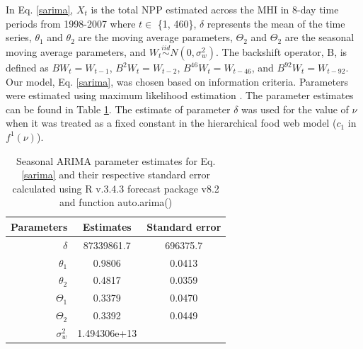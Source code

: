 \documentclass[oneside,12pt,final]{sty/ucthesis-CA2012}
\let\cite\citep                             %
\begin{document}
\begin{mainmatter}
In Eq. \ref{sarima}, $X_t$ is the total NPP estimated across the MHI in 8-day time periods from 1998-2007 where $t \in$ \{1, 460\}, $\delta$ represents the mean of the time series, $\theta_1$ and $\theta_2$ are the moving average parameters, $\Theta_2$ and $\Theta_2$ are the seasonal moving average parameters, and $W_t \stackrel{iid}{\sim} N(0,\sigma_w^2)$. The backshift operator, B, is defined as $ BW_t  = W_{t-1}$, $B^2W_t  = W_{t-2}$, $B^{46}W_t  = W_{t-46}$, and $B^{92}W_t  = W_{t-92}$.  Our model, Eq. \ref{sarima}, was chosen based on information criteria. Parameters were estimated using maximum likelihood estimation \cite{forecast1, forecast2}. The parameter estimates can be found in Table \ref{sarima_parameters}. The estimate of parameter $\delta$ was used for the value of $\nu$ when it was treated as a fixed constant in the hierarchical food web model ($c_1$ in $f^1(\nu)$).

\begin{table}[H]
\centering
\caption{Seasonal ARIMA parameter estimates for Eq. \ref{sarima} and their respective standard error calculated using R v.3.4.3 \cite{Rcite} forecast package v8.2 and function auto.arima() \cite{forecast1, forecast2} }
\begin{tabular}{r|c|c}
  \hline \small
 Parameters & Estimates & Standard error \\ 
   \hline
   $\delta$ & 87339861.7 & 696375.7 \\   
   $\theta_1$ & 0.9806 & 0.0413 \\
   $\theta_2$ & 0.4817 & 0.0359 \\
   $\Theta_1$ & 0.3379 & 0.0470 \\
   $\Theta_2$ & 0.3392 & 0.0449 \\
   $\sigma_w^2$ & 1.494306e+13 & \\
   \hline
\end{tabular} 
\label{sarima_parameters}
\end{table}


\end{mainmatter}
\end{document}
